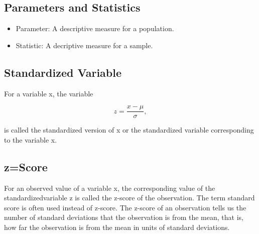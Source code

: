 \documentclass[12pt]{article}
\begin{document}
        \subsection*{Parameters and Statistics}
            \begin{itemize}
                \item Parameter: A descriptive measure for a population.
                \item Statistic: A decriptive measure for a sample.
            \end{itemize}
        \subsection*{Standardized Variable}
            For a variable x, the variable
            \begin{center}
                \[
                    z = \frac{x-\mu}{\sigma},    
                \]
            \end{center}
            is called the standardized version of x or the standardized variable corresponding to the variable x.
        \subsection*{z=Score}
            For an observed value of a variable x, the corresponding value of the standardizedvariable z is called
            the z-score of the observation. The term standard score is often used instead of z-score. The z-score of
            an observation tells us the number of standard deviations that the observation is from the mean, that is,
            how far the observation is from the mean in units of standard deviations.
\end{document}
